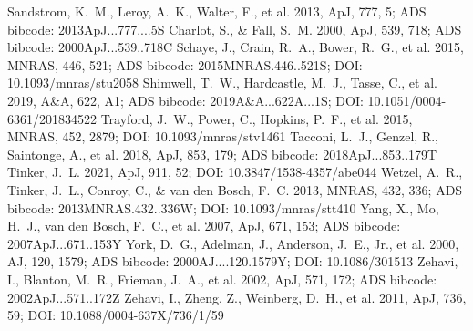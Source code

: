 \documentclass[twocolumn]{aastex631}
\begin{document}
\begin{thebibliography}{}
 Sandstrom, K.~M., Leroy, A.~K., Walter, F., et al. 2013, ApJ, 777, 5; ADS bibcode: 2013ApJ...777....5S
 Charlot, S., \& Fall, S.~M. 2000, ApJ, 539, 718; ADS bibcode: 2000ApJ...539..718C
 Schaye, J., Crain, R.~A., Bower, R.~G., et al. 2015, MNRAS, 446, 521; ADS bibcode: 2015MNRAS.446..521S; DOI: 10.1093/mnras/stu2058
 Shimwell, T.~W., Hardcastle, M.~J., Tasse, C., et al. 2019, A\&A, 622, A1; ADS bibcode: 2019A\&A...622A...1S; DOI: 10.1051/0004-6361/201834522
 Trayford, J.~W., Power, C., Hopkins, P.~F., et al. 2015, MNRAS, 452, 2879; DOI: 10.1093/mnras/stv1461
 Tacconi, L.~J., Genzel, R., Saintonge, A., et al. 2018, ApJ, 853, 179; ADS bibcode: 2018ApJ...853..179T
 Tinker, J.~L. 2021, ApJ, 911, 52; DOI: 10.3847/1538-4357/abe044
 Wetzel, A.~R., Tinker, J.~L., Conroy, C., \& van den Bosch, F.~C. 2013, MNRAS, 432, 336; ADS bibcode: 2013MNRAS.432..336W; DOI: 10.1093/mnras/stt410
 Yang, X., Mo, H.~J., van den Bosch, F.~C., et al. 2007, ApJ, 671, 153; ADS bibcode: 2007ApJ...671..153Y
 York, D.~G., Adelman, J., Anderson, J.~E., Jr., et al. 2000, AJ, 120, 1579; ADS bibcode: 2000AJ....120.1579Y; DOI: 10.1086/301513
 Zehavi, I., Blanton, M.~R., Frieman, J.~A., et al. 2002, ApJ, 571, 172; ADS bibcode: 2002ApJ...571..172Z
 Zehavi, I., Zheng, Z., Weinberg, D.~H., et al. 2011, ApJ, 736, 59; DOI: 10.1088/0004-637X/736/1/59
\end{thebibliography}
\end{document}
